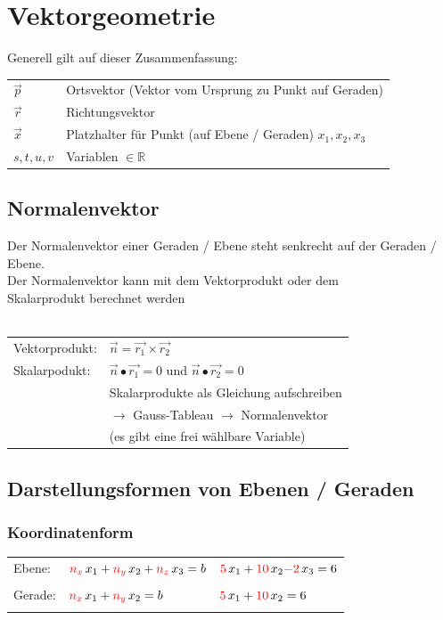\section{Vektorgeometrie}
		  Generell gilt auf dieser Zusammenfassung: \\
			
			\begin{tabular}{ll}
			$\vec{p}$ & Ortsvektor (Vektor vom Ursprung zu Punkt auf Geraden)\\
			$\vec{r}$ & Richtungsvektor \\
			$\vec{x}$ & Platzhalter für Punkt (auf Ebene / Geraden) $x_1, x_2, x_3$ \\
			$s, t, u, v$ & Variablen $\in \mathbb{R}$ \\
			\end{tabular}						
			
			
			\subsection{Normalenvektor}		    
		   	Der Normalenvektor einer Geraden / Ebene steht senkrecht auf der Geraden / Ebene.	\\
		   	Der Normalenvektor kann mit dem Vektorprodukt oder dem  \\
		   	Skalarprodukt berechnet werden\\
		   	\\
		   	\begin{tabular}{ll}
		   	Vektorprodukt: & $\vec{n} =  \vec{r_1} \times \vec{r_2}$ \\
		   	Skalarpodukt: & $\vec{n} \bullet \vec{r_1} = 0$ und $\vec{n} \bullet \vec{r_2} = 0$  \\
		   	& Skalarprodukte als Gleichung aufschreiben \\
		   	& $\rightarrow$ Gauss-Tableau  $\rightarrow$ Normalenvektor \\
		   	& (es gibt eine frei wählbare Variable) \\
			\end{tabular}		   			
			
			
		    \subsection{Darstellungsformen von Ebenen / Geraden}	
		    
			\subsubsection{Koordinatenform}	%
			\begin{tabular}{lll}
			Ebene: & $\textcolor{red}{n_x} \, x_1 + \textcolor{red}{n_y} \, x_2 + \textcolor{red}{n_z} \, x_3 = b$ & $\textcolor{red}{5} \, x_1 + \textcolor{red}{10} \, x_2 \textcolor{red}{- 2} \, x_3 = 6 $ \\
			\\
			Gerade: &  $\textcolor{red}{n_x} \, x_1 + \textcolor{red}{n_y} \, x_2  = b$ & $\textcolor{red}{5} \, x_1 + \textcolor{red}{10} \, x_2 = 6 $ \\
			\\
			\end{tabular}						    

